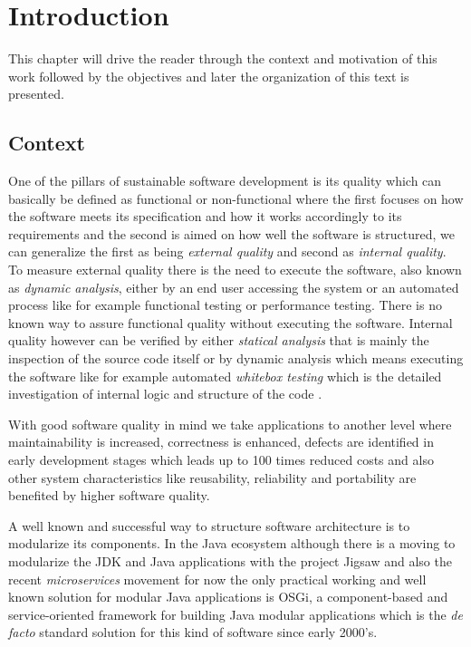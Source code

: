 \chapter{Introduction}
 This chapter will drive the reader through the context and motivation of this work followed by the objectives and later the organization of this text is presented.  
 

\section{Context}

One of the pillars of sustainable software development is its quality which can basically be defined as functional or non-functional where the first focuses on how the software meets its specification and how it works accordingly to its requirements and the second is aimed on how well the software is structured, we can generalize the first as being \emph{external quality} and second as \emph{internal quality}. To measure external quality there is the need to execute the software, also known as \emph{dynamic analysis}, either by an end user accessing the system or an automated process like for example functional testing or performance testing. There is no known way to assure functional quality without executing the software. Internal quality however can be verified by either \emph{statical analysis} that is mainly the inspection of the source code itself or by dynamic analysis which means executing the software like for example automated \emph{whitebox testing} which is the detailed
investigation of internal logic and structure of the code \citep{Khan 2012}.   

With good software quality in mind we take applications to another level where maintainability is increased, correctness is enhanced, defects are identified in early development stages which leads up to 100 times reduced costs \citep{Beohm 2001} and also other system characteristics like reusability, reliability and portability are benefited by higher software quality.  

A well known and successful way to structure software architecture is to modularize its components. In the Java ecosystem although there is a moving to modularize the JDK and Java applications with the project Jigsaw \citep{Krill 2012} and also the recent \emph{microservices} movement \citep{Knorr 2014} for now the only practical working and well known solution for modular Java applications is OSGi, a component-based and service-oriented framework for building Java modular applications which is the \emph{de facto} standard solution for this kind of software since early 2000's. 

